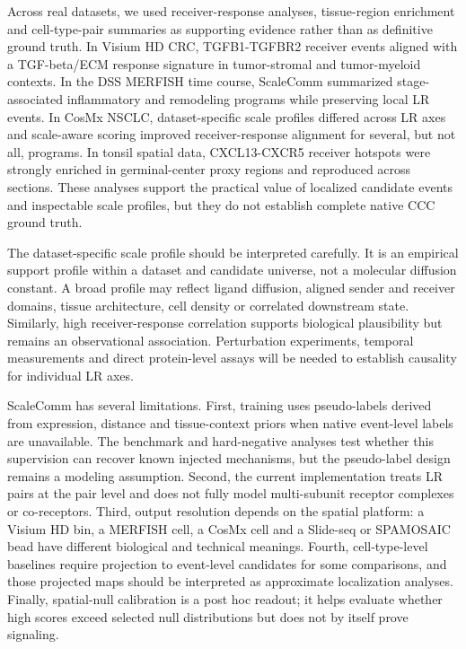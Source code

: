 \documentclass[referee,lineno,pdflatex,sn-vancouver-num]{sn-jnl}
\begin{document}
Across real datasets, we used receiver-response analyses, tissue-region enrichment and cell-type-pair summaries as supporting evidence rather than as definitive ground truth. In Visium HD CRC, TGFB1-TGFBR2 receiver events aligned with a TGF-beta/ECM response signature in tumor-stromal and tumor-myeloid contexts. In the DSS MERFISH time course, ScaleComm summarized stage-associated inflammatory and remodeling programs while preserving local LR events. In CosMx NSCLC, dataset-specific scale profiles differed across LR axes and scale-aware scoring improved receiver-response alignment for several, but not all, programs. In tonsil spatial data, CXCL13-CXCR5 receiver hotspots were strongly enriched in germinal-center proxy regions and reproduced across sections. These analyses support the practical value of localized candidate events and inspectable scale profiles, but they do not establish complete native CCC ground truth.

The dataset-specific scale profile should be interpreted carefully. It is an empirical support profile within a dataset and candidate universe, not a molecular diffusion constant. A broad profile may reflect ligand diffusion, aligned sender and receiver domains, tissue architecture, cell density or correlated downstream state. Similarly, high receiver-response correlation supports biological plausibility but remains an observational association. Perturbation experiments, temporal measurements and direct protein-level assays will be needed to establish causality for individual LR axes.

ScaleComm has several limitations. First, training uses pseudo-labels derived from expression, distance and tissue-context priors when native event-level labels are unavailable. The benchmark and hard-negative analyses test whether this supervision can recover known injected mechanisms, but the pseudo-label design remains a modeling assumption. Second, the current implementation treats LR pairs at the pair level and does not fully model multi-subunit receptor complexes or co-receptors. Third, output resolution depends on the spatial platform: a Visium HD bin, a MERFISH cell, a CosMx cell and a Slide-seq or SPAMOSAIC bead have different biological and technical meanings. Fourth, cell-type-level baselines require projection to event-level candidates for some comparisons, and those projected maps should be interpreted as approximate localization analyses. Finally, spatial-null calibration is a post hoc readout; it helps evaluate whether high scores exceed selected null distributions but does not by itself prove signaling.
\end{document}
